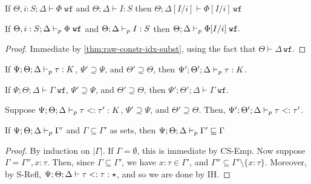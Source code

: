 \begin{theorem}
If $\Theta, i : S ; \Delta \vdash \Phi \; \texttt{wf}$ and $\Theta ; \Delta \vdash I : S$ then $\Theta ; \Delta[I/i] \vdash \Phi[I/i] \, \texttt{wf}$
\label{thm:raw-constr-idx-subst}
\end{theorem}


\begin{theorem}
If $\Theta, i : S ; \Delta \vdash_p \Phi \; \texttt{wf}$ and $\Theta ; \Delta \vdash_p I : S$ then $\Theta ; \Delta \vdash_p \Phi[I/i] \; \texttt{wf}.$
\label{thm:constr-idx-subst}
\end{theorem}
\begin{proof}
Immediate by \autoref{thm:raw-constr-idx-subst}, using the fact that $\Theta \vdash \Delta \, \texttt{wf}$.
\end{proof}


\begin{theorem}
If $\Psi ; \Theta ; \Delta \vdash_p \tau : K$, $\Psi' \supseteq \Psi$, and $\Theta' \supseteq \Theta$, then
$\Psi' ; \Theta' ; \Delta \vdash_p \tau : K$.
\end{theorem}

\begin{theorem}
If $\Psi ; \Theta ; \Delta \vdash \Gamma \; \texttt{wf}$, $\Psi' \supseteq \Psi$, and $\Theta' \supseteq \Theta$, then
$\Psi' ; \Theta' ; \Delta \vdash \Gamma \; \texttt{wf}$.
\end{theorem}

\typeidxsubst*


\begin{theorem}
Suppose $\Psi ; \Theta ; \Delta \vdash_p \tau <: \tau' : K$, $\Psi' \supseteq \Psi$, and $\Theta' \supseteq \Theta$.
Then, $\Psi' ; \Theta' ; \Delta \vdash_p \tau <: \tau'$.
\end{theorem}

\subtystreng*


\begin{theorem}
If $\Psi ; \Theta ; \Delta \vdash_p \Gamma'$ and $\Gamma \subseteq \Gamma'$ as sets, then $\Psi ; \Theta ; \Delta \vdash_p \Gamma' \sqsubseteq \Gamma$
\label{thm:ctx-sub-subset1}
\end{theorem}
\begin{proof}
By induction on $|\Gamma|$.
If $\Gamma = \emptyset$, this is immediate by CS-Emp.
Now suppose $\Gamma = \Gamma'', x : \tau$. Then, since $\Gamma \subseteq \Gamma'$, we have $x : \tau \in \Gamma'$, and $\Gamma'' \subseteq \Gamma' \setminus \{x : \tau\}$. Moreover, by S-Refl, $\Psi ; \Theta ; \Delta \vdash \tau <: \tau : \star$, and so we are done by IH.
\end{proof}

